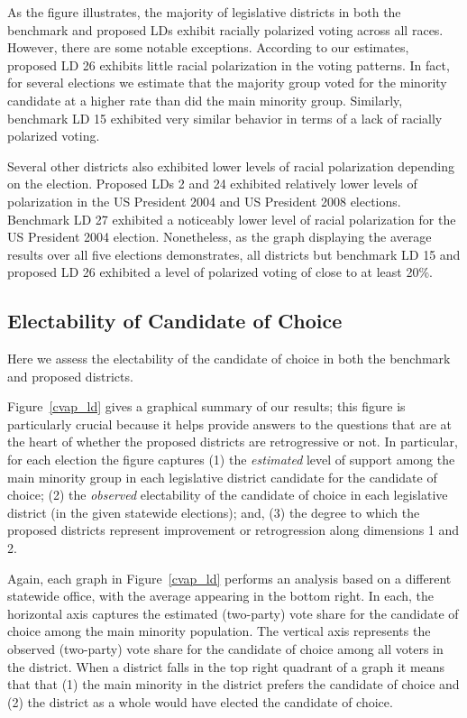 \documentclass[12pt]{article}
\begin{document}
As the figure illustrates, the majority of legislative districts in
both the benchmark and proposed LDs exhibit racially polarized voting
across all races. However, there are some notable exceptions.
According to our estimates, proposed LD 26 exhibits little racial
polarization in the voting patterns. In fact, for several elections we
estimate that the majority group voted for the minority candidate at a
higher rate than did the main minority group. Similarly, benchmark LD
15 exhibited very similar behavior in terms of a lack of racially
polarized voting.

Several other districts also exhibited lower levels of racial polarization depending on the election. Proposed LDs 2 and 24 exhibited relatively lower levels of polarization in the US President 2004 and US President 2008 elections. Benchmark LD 27 exhibited a noticeably lower level of racial polarization for the US President 2004 election. Nonetheless, as the graph displaying the average results over all five elections demonstrates, all districts but benchmark LD 15 and proposed LD 26 exhibited a level of polarized voting of close to at least 20\%.

\subsection{Electability of Candidate of Choice}

Here we assess the electability of the candidate of choice in both the
benchmark and proposed districts.


Figure~\ref{cvap_ld} gives a graphical summary of our results; this
figure is particularly crucial because it helps provide answers to the
questions that are at the heart of whether the proposed districts are
retrogressive or not. In particular, for each election the figure
captures (1) the {\it estimated} level of support among the main
minority group in each legislative district candidate for the
candidate of choice; (2) the {\it observed} electability of the
candidate of choice in each legislative district (in the given
statewide elections); and, (3) the degree to which the proposed
districts represent improvement or retrogression along dimensions 1
and 2.

Again, each graph in Figure~\ref{cvap_ld} performs an analysis based
on a different statewide office, with the average appearing in the
bottom right.  In each, the horizontal axis captures the estimated
(two-party) vote share for the candidate of choice among the main
minority population. The vertical axis represents the observed
(two-party) vote share for the candidate of choice among all voters in
the district.  When a district falls in the top right quadrant of a
graph it means that that (1) the main minority in the district prefers
the candidate of choice and (2) the district as a whole would have
elected the candidate of choice.
\end{document}

